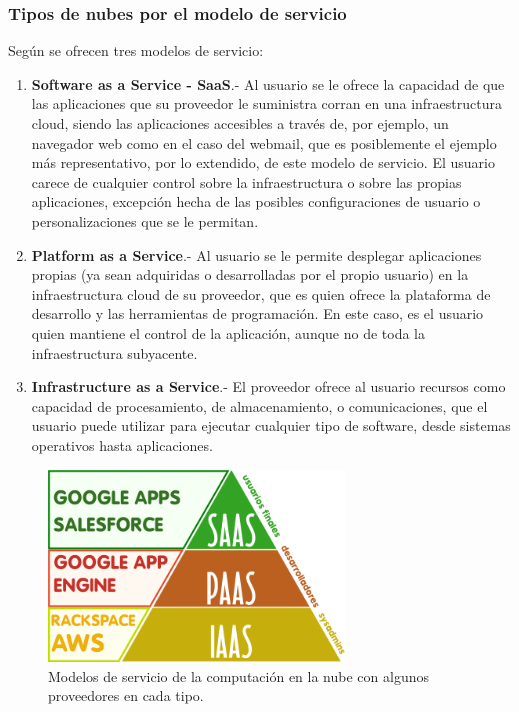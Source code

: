 \subsubsection{Tipos de nubes por el modelo de servicio}
Seg\'un \cite{nist} se ofrecen tres modelos de servicio:
\begin{enumerate}
    \item \textbf{Software as a Service - SaaS}.- Al usuario se le ofrece la
          capacidad de que las aplicaciones  que  su  proveedor  le  suministra
          corran  en  una  infraestructura cloud, siendo las aplicaciones accesibles
          a trav\'es de, por ejemplo, un navegador web como en el caso del webmail,
          que es posiblemente el ejemplo m\'as representativo, por lo extendido,
          de este modelo de servicio. El usuario carece de cualquier control sobre
          la infraestructura o sobre las propias aplicaciones, excepci\'on hecha
          de las posibles configuraciones de usuario o personalizaciones que se
          le permitan.
    \item \textbf{Platform as a Service}.- Al usuario se le permite desplegar
          aplicaciones propias  (ya  sean  adquiridas  o  desarrolladas  por  el
          propio  usuario)  en  la  infraestructura cloud de  su  proveedor, que
          es  quien  ofrece  la  plataforma  de desarrollo y las herramientas de
          programaci\'on. En este caso, es el usuario quien mantiene el control de
          la aplicaci\'on, aunque no de toda la infraestructura subyacente.
    \item \textbf{Infrastructure as a Service}.- El proveedor ofrece al usuario
          recursos como capacidad  de  procesamiento,  de  almacenamiento,  o
          comunicaciones, que el usuario puede utilizar para ejecutar cualquier
          tipo de software, desde sistemas operativos hasta aplicaciones.
\end{enumerate}

\begin{figure}[h]
    \centering
    \captionsetup{justification=centering}
    \includegraphics[width=0.7\textwidth]{Imagenes/Bitmap/cloud1}
    \caption{Modelos de servicio de la computaci\'on en la nube con algunos proveedores en cada tipo.}
    \label{fig:cloud1}
\end{figure}

